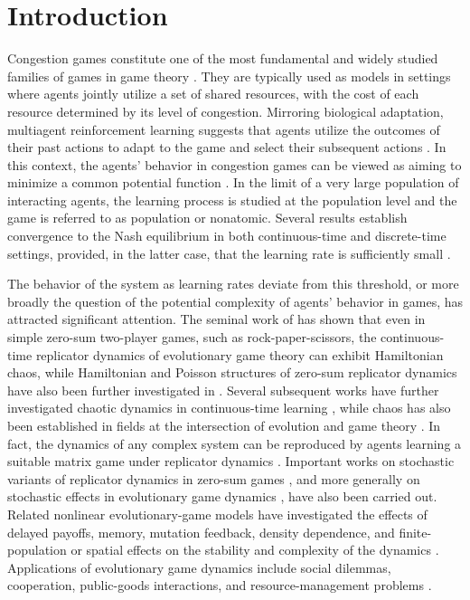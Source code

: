 \documentclass{article}
\theoremstyle{plain}
\theoremstyle{definition}
\begin{document}
\section{Introduction}\label{intro}
Congestion games constitute one of the most fundamental and widely studied families of games in game theory \cite{rosenthal,monderer}. They are typically used as models in settings where agents jointly utilize a set of shared resources, with the cost of each resource determined by its level of congestion. Mirroring biological adaptation, multiagent reinforcement learning suggests that agents utilize the outcomes of their past actions to adapt to the game and select their subsequent actions \cite{camerer,sandholm}. In this context, the agents' behavior in congestion games can be viewed as aiming to minimize a common potential function \cite{monderer,bielawski2}. In the limit of a very large population of interacting agents, the learning process is studied at the population level and the game is referred to as population or nonatomic. Several results establish convergence to the Nash equilibrium in both continuous-time and discrete-time settings, provided, in the latter case, that the learning rate is sufficiently small \cite{monderer,sandholm,palaiopanos,krichene}.

The behavior of the system as learning rates deviate from this threshold, or more broadly the question of the potential complexity of agents' behavior in games, has attracted significant attention. The seminal work of \cite{sato} has shown that even in simple zero-sum two-player games, such as rock-paper-scissors, the continuous-time replicator dynamics of evolutionary game theory \cite{sandholm,hofbauer,allen,borgers,fudenberg,fudenberg2} can exhibit Hamiltonian chaos, while Hamiltonian and Poisson structures of zero-sum replicator dynamics have also been further investigated in \cite{griffin1}. Several subsequent works have further investigated chaotic dynamics in continuous-time learning \cite{sato2,sato3}, while chaos has also been established in fields at the intersection of evolution and game theory \cite{nowak,chattopadhyay,you,krieger,pati}. In fact, the dynamics of any complex system can be reproduced by agents learning a suitable matrix game under replicator dynamics \cite{andrade}. Important works on stochastic variants of replicator dynamics in zero-sum games \cite{engel}, and more generally on stochastic effects in evolutionary game dynamics \cite{li2}, have also been carried out. Related nonlinear evolutionary-game models have investigated the effects of delayed payoffs, memory, mutation feedback, density dependence, and finite-population or spatial effects on the stability and complexity of the dynamics \cite{yuan,bischi_memory,wang1,wang2,griffin2}. Applications of evolutionary game dynamics include social dilemmas, cooperation, public-goods interactions, and resource-management problems \cite{mintz,lin,feng,ding,li,liu_pool,yang_cooperation,yoshioka}.
\end{document}

